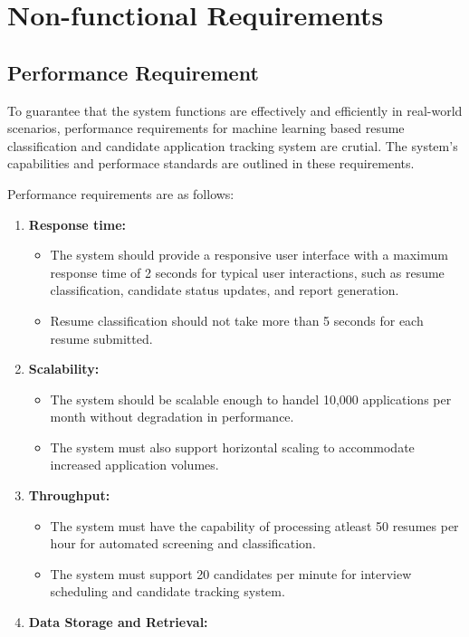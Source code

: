 \section{Non-functional Requirements}
\subsection{Performance Requirement}
To guarantee that the system functions are effectively and efficiently in real-world scenarios, performance requirements for machine learning based resume classification and candidate application tracking system are crutial. The system's capabilities and performace standards are outlined in these requirements.

Performance requirements are as follows:

\begin{enumerate}
    \item \textbf{Response time:}
		\begin{itemize}
			\item The system should provide a responsive user interface with a maximum response time of 2 seconds for typical user interactions, such as resume classification, candidate status updates, and report generation.
			\item Resume classification should not take more than 5 seconds for each resume submitted.
		\end{itemize}
    \item \textbf{Scalability:}
		\begin{itemize}
			\item The system should be scalable enough to handel 10,000 applications per month without degradation in performance.
			\item The system must also support horizontal scaling to accommodate increased 	application volumes.
		\end{itemize}
    \item \textbf{Throughput:}
		\begin{itemize}
			\item The system must have the capability of processing atleast 50 resumes per hour for automated screening and classification.
			\item	The system must support 20 candidates per minute for interview scheduling and candidate tracking system.
		\end{itemize}
    \item \textbf{Data Storage and Retrieval:}
		\begin{itemize}

\end{itemize}
\end{enumerate}
